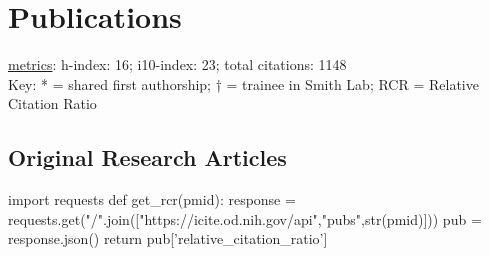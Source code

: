 \documentclass[11pt, letterpaper]{article}
\begin{document}
\section*{Publications}
\href{https://scholar.google.com/citations?user=czV7OcQAAAAJ&hl=en}{\aiGoogleScholar \hspace{.05cm} metrics}: h-index: 16; i10-index: 23; total citations: 1148 \\ 
Key: * = shared first authorship; † = trainee in Smith Lab; RCR = Relative Citation Ratio

\subsection*{Original Research Articles}

\begin{pycode}
import requests
def get_rcr(pmid):
    response = requests.get("/".join(["https://icite.od.nih.gov/api","pubs",str(pmid)]))
    pub = response.json()
    return pub['relative_citation_ratio']
\end{pycode}
\end{document}
